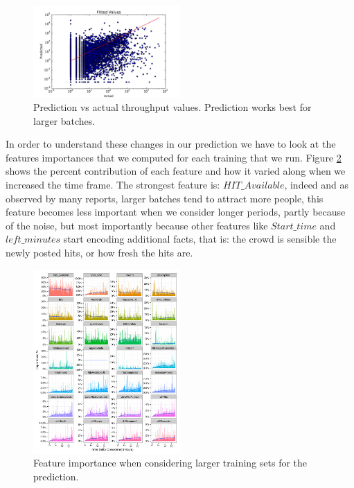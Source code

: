 \begin{figure}[htbp]
	\centering
		\includegraphics[width=0.5\textwidth]{figures/predictions_3}
	\caption{Prediction vs actual throughput values. Prediction works best for larger batches.}
	\label{fig:pred}
\end{figure}

In order to understand these changes in our prediction we have to look at the features importances that we computed for each training that we run. Figure \ref{fig:importances} shows the percent contribution of each feature and how it varied along when we increased the time frame.
The strongest feature is: $HIT\_Available$, indeed and as observed by many reports, larger batches tend to attract more people, this feature becomes less important when we consider longer periods, partly because of the noise, but most importantly because other features like $Start\_time$ and $left\_minutes$ start encoding additional facts, that is: the crowd is sensible the newly posted hits, or how fresh the hits are.

\begin{figure}[htbp]
	\centering
		\includegraphics[width=0.5\textwidth]{figures/importances}
	\caption{Feature importance when considering larger training sets for the prediction.}
	\label{fig:importances}
\end{figure}
